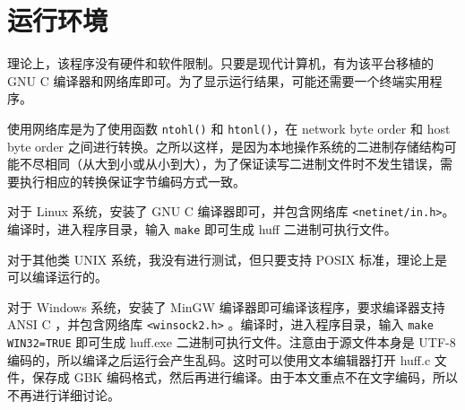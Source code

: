 \section{运行环境}

理论上，该程序没有硬件和软件限制。只要是现代计算机，有为该平台移植的 GNU C 编译器和网络库即可。为了显示运行结果，可能还需要一个终端实用程序。

使用网络库是为了使用函数 \verb|ntohl()| 和 \verb|htonl()|，在 network byte order 和 host byte order 之间进行转换。之所以这样，是因为本地操作系统的二进制存储结构可能不尽相同（从大到小或从小到大），为了保证读写二进制文件时不发生错误，需要执行相应的转换保证字节编码方式一致。

对于 Linux 系统，安装了 GNU C 编译器即可，并包含网络库 \verb|<netinet/in.h>|。编译时，进入程序目录，输入 \verb|make| 即可生成 {\sf huff} 二进制可执行文件。

对于其他类 UNIX 系统，我没有进行测试，但只要支持 POSIX 标准，理论上是可以编译运行的。

对于 Windows 系统，安装了 MinGW 编译器即可编译该程序，要求编译器支持 ANSI C ，并包含网络库 \verb|<winsock2.h>| 。编译时，进入程序目录，输入 \verb|make WIN32=TRUE| 即可生成 {\sf huff.exe} 二进制可执行文件。注意由于源文件本身是 UTF-8 编码的，所以编译之后运行会产生乱码。这时可以使用文本编辑器打开 {\sf huff.c} 文件，保存成 GBK 编码格式，然后再进行编译。由于本文重点不在文字编码，所以不再进行详细讨论。
